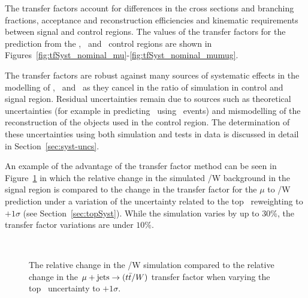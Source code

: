The transfer factors account for differences in the cross sections and branching fractions,
acceptance and reconstruction efficiencies and kinematic requirements between signal 
and control regions. The values of the transfer factors for the prediction from the \mj,
\mmj~and \gj~control regions are shown in Figures~\ref{fig:tfSyst_nominal_mu}-\ref{fig:tfSyst_nominal_mumug}.

The transfer factors are robust against many sources of systematic effects in the modelling of \scalht, \nb~and \njet~as they cancel in the ratio of simulation in control and signal region. Residual uncertainties remain due to sources such as theoretical uncertainties (for example
in predicting \znunu~using \gj~events) and mismodelling of the reconstruction of the objects
used in the control region. The determination of these uncertainties using both simulation 
and tests in data is discussed in detail in Section~\ref{sec:syst-uncs}.

An example of the advantage of the transfer factor method can be seen 
in Figure~\ref{fig:tfSimVar} in which the relative change in the simulated \ttbar/W 
background in the signal region is compared to the change in the transfer factor for 
the $\mu$ to \ttbar/W prediction under a variation of
the uncertainty related to the top \pt~reweighting to $+1\sigma$
(see Section~\ref{sec:topSyst}). While the simulation varies 
by up to 30\%, the transfer factor variations are under $10\%$.

\begin{figure}[!ht]
  \centering
   ~~
  \\
  \caption{\label{fig:tfSimVar} The relative change in the
  \ttbar/W simulation compared to the relative change in the $\mu + \textrm{jets} \rightarrow (t\bar{t}/W)$ transfer
  factor when varying the top \pt~uncertainty to $+1\sigma$.
  }
\end{figure}

